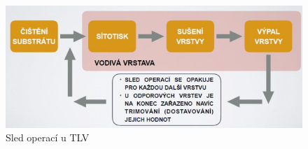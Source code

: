 \begin{figure}[h]
   \begin{center}
     \includegraphics[scale=0.6]{images/Operace.png}
   \end{center}
   \caption{Sled operací u TLV}
\end{figure}



